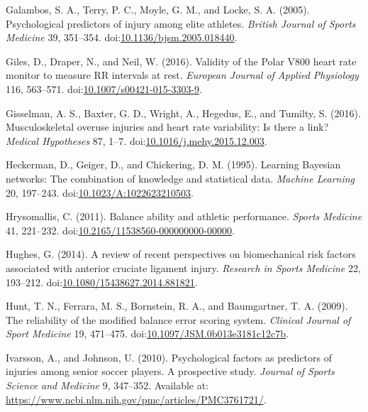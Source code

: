 \documentclass[
  english,
  man,floatsintext]{apa6}
\newlength{\cslhangindent}
\newenvironment{cslreferences}%
  {\setlength{\parindent}{0pt}%
  \everypar{\setlength{\hangindent}{\cslhangindent}}\ignorespaces}%
  {\par}
\begin{document}
\begin{cslreferences}
\leavevmode\hypertarget{ref-Galambos2005}{}%
Galambos, S. A., Terry, P. C., Moyle, G. M., and Locke, S. A. (2005). Psychological predictors of injury among elite athletes. \emph{British Journal of Sports Medicine} 39, 351--354. doi:\href{https://doi.org/10.1136/bjsm.2005.018440}{10.1136/bjsm.2005.018440}.

\leavevmode\hypertarget{ref-Giles2016}{}%
Giles, D., Draper, N., and Neil, W. (2016). Validity of the Polar V800 heart rate monitor to measure RR intervals at rest. \emph{European Journal of Applied Physiology} 116, 563--571. doi:\href{https://doi.org/10.1007/s00421-015-3303-9}{10.1007/s00421-015-3303-9}.

\leavevmode\hypertarget{ref-Gisselman2016}{}%
Gisselman, A. S., Baxter, G. D., Wright, A., Hegedus, E., and Tumilty, S. (2016). Musculoskeletal overuse injuries and heart rate variability: Is there a link? \emph{Medical Hypotheses} 87, 1--7. doi:\href{https://doi.org/10.1016/j.mehy.2015.12.003}{10.1016/j.mehy.2015.12.003}.

\leavevmode\hypertarget{ref-Heckerman1995}{}%
Heckerman, D., Geiger, D., and Chickering, D. M. (1995). Learning Bayesian networks: The combination of knowledge and statistical data. \emph{Machine Learning} 20, 197--243. doi:\href{https://doi.org/10.1023/A:1022623210503}{10.1023/A:1022623210503}.

\leavevmode\hypertarget{ref-Hrysomallis2011}{}%
Hrysomallis, C. (2011). Balance ability and athletic performance. \emph{Sports Medicine} 41, 221--232. doi:\href{https://doi.org/10.2165/11538560-000000000-00000}{10.2165/11538560-000000000-00000}.

\leavevmode\hypertarget{ref-Hughes2014}{}%
Hughes, G. (2014). A review of recent perspectives on biomechanical risk factors associated with anterior cruciate ligament injury. \emph{Research in Sports Medicine} 22, 193--212. doi:\href{https://doi.org/10.1080/15438627.2014.881821}{10.1080/15438627.2014.881821}.

\leavevmode\hypertarget{ref-Hunt2009}{}%
Hunt, T. N., Ferrara, M. S., Bornstein, R. A., and Baumgartner, T. A. (2009). The reliability of the modified balance error scoring system. \emph{Clinical Journal of Sport Medicine} 19, 471--475. doi:\href{https://doi.org/10.1097/JSM.0b013e3181c12c7b}{10.1097/JSM.0b013e3181c12c7b}.

\leavevmode\hypertarget{ref-Ivarsson2010}{}%
Ivarsson, A., and Johnson, U. (2010). Psychological factors as predictors of injuries among senior soccer players. A prospective study. \emph{Journal of Sports Science and Medicine} 9, 347--352. Available at: \url{https://www.ncbi.nlm.nih.gov/pmc/articles/PMC3761721/}.


\end{cslreferences}
\end{document}

